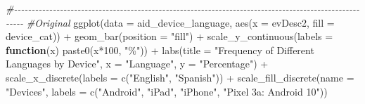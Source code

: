 \documentclass[
]{article}
\newenvironment{Shaded}{\begin{snugshade}}{\end{snugshade}}
\newcommand{\AttributeTok}[1]{\textcolor[rgb]{0.77,0.63,0.00}{#1}}
\newcommand{\CommentTok}[1]{\textcolor[rgb]{0.56,0.35,0.01}{\textit{#1}}}
\newcommand{\ControlFlowTok}[1]{\textcolor[rgb]{0.13,0.29,0.53}{\textbf{#1}}}
\newcommand{\DecValTok}[1]{\textcolor[rgb]{0.00,0.00,0.81}{#1}}
\newcommand{\FunctionTok}[1]{\textcolor[rgb]{0.00,0.00,0.00}{#1}}
\newcommand{\NormalTok}[1]{#1}
\newcommand{\SpecialCharTok}[1]{\textcolor[rgb]{0.00,0.00,0.00}{#1}}
\newcommand{\StringTok}[1]{\textcolor[rgb]{0.31,0.60,0.02}{#1}}
\begin{document}
\begin{Shaded}
\begin{Highlighting}[]
\CommentTok{\#{-}{-}{-}{-}{-}{-}{-}{-}{-}{-}{-}{-}{-}{-}{-}{-}{-}{-}{-}{-}{-}{-}{-}{-}{-}{-}{-}{-}{-}{-}{-}{-}{-}{-}{-}{-}{-}{-}{-}{-}{-}{-}{-}{-}{-}{-}{-}{-}{-}{-}{-}{-}{-}{-}{-}{-}{-}{-}{-}{-}{-}{-}{-}{-}{-}{-}{-}{-}{-}{-}{-}{-}{-}{-}{-}{-}{-}{-}{-}{-}{-}{-}{-}{-}{-}{-}{-}{-}{-}{-}{-}{-}{-}{-}{-}{-}{-}{-}{-}{-}{-}{-}{-}}
\CommentTok{\#Original }
\FunctionTok{ggplot}\NormalTok{(}\AttributeTok{data =}\NormalTok{ aid\_device\_language, }\FunctionTok{aes}\NormalTok{(}\AttributeTok{x =}\NormalTok{ evDesc2, }\AttributeTok{fill =}\NormalTok{ device\_cat)) }\SpecialCharTok{+} 
  \FunctionTok{geom\_bar}\NormalTok{(}\AttributeTok{position =} \StringTok{"fill"}\NormalTok{) }\SpecialCharTok{+} 
  \FunctionTok{scale\_y\_continuous}\NormalTok{(}\AttributeTok{labels =} \ControlFlowTok{function}\NormalTok{(x) }\FunctionTok{paste0}\NormalTok{(x}\SpecialCharTok{*}\DecValTok{100}\NormalTok{, }\StringTok{"\%"}\NormalTok{)) }\SpecialCharTok{+} 
   \FunctionTok{labs}\NormalTok{(}\AttributeTok{title =} \StringTok{"Frequency of Different Languages by Device"}\NormalTok{, }
       \AttributeTok{x =} \StringTok{"Language"}\NormalTok{, }
       \AttributeTok{y =} \StringTok{"Percentage"}\NormalTok{) }\SpecialCharTok{+}
      \FunctionTok{scale\_x\_discrete}\NormalTok{(}\AttributeTok{labels =} \FunctionTok{c}\NormalTok{(}\StringTok{"English"}\NormalTok{, }\StringTok{"Spanish"}\NormalTok{)) }\SpecialCharTok{+} 
      \FunctionTok{scale\_fill\_discrete}\NormalTok{(}\AttributeTok{name =} \StringTok{"Devices"}\NormalTok{, }\AttributeTok{labels =} \FunctionTok{c}\NormalTok{(}\StringTok{"Android"}\NormalTok{, }\StringTok{"iPad"}\NormalTok{, }\StringTok{"iPhone"}\NormalTok{, }\StringTok{"Pixel 3a: Android 10"}\NormalTok{)) }
\end{Highlighting}
\end{Shaded}
\end{document}
